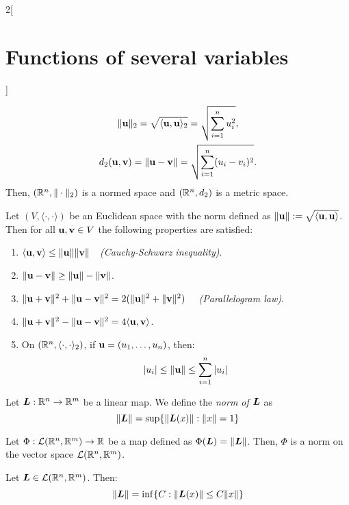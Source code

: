 \documentclass[../../../main.tex]{subfiles}
\begin{document}
\begin{multicols}{2}[\section{Functions of several variables}]
\begin{corollary}
    \begin{gather*}
      \|\vb{u}\|_2=\sqrt{\langle \vb{u},\vb{u}\rangle_2}=\sqrt{\sum_{i=1}^nu_i^2},\\
      d_2(\vb{u},\vb{v})=\|\vb{u}-\vb{v}\|=\sqrt{\sum_{i=1}^n(u_i-v_i)^2}.
    \end{gather*}
    Then, $(\mathbb{R}^n,\|\cdot\|_2)$ is a normed space and $(\mathbb{R}^n,d_2)$ is a metric space.
  \end{corollary}
  \begin{prop}
    Let $(V,\langle\cdot,\cdot\rangle)$ be an Euclidean space with the norm defined as $\|\vb{u}\|:=\sqrt{\langle \vb{u},\vb{u}\rangle}$. Then for all $\vb{u},\vb{v}\in V$ the following properties are satisfied:
    \begin{enumerate}
      \item $\langle \vb{u},\vb{v}\rangle\leq\|\vb{u}\|\|\vb{v}\|\quad$\textit{(Cauchy-Schwarz inequality)}.
      \item $\|\vb{u}-\vb{v}\|\geq\|\vb{u}\|-\|\vb{v}\|$.
      \item $\|\vb{u}+\vb{v}\|^2+\|\vb{u}-\vb{v}\|^2=2(\|\vb{u}\|^2+\|\vb{v}\|^2)\quad$ \textit{(Parallelogram law)}.
      \item $\|\vb{u}+\vb{v}\|^2-\|\vb{u}-\vb{v}\|^2=4\langle \vb{u},\vb{v}\rangle$.
      \item On $(\mathbb{R}^n,\langle\cdot,\cdot\rangle_2)$, if $\vb{u}=(u_1,\ldots,u_n)$, then: $$|u_i|\leq\|\vb{u}\|\leq\sum_{i=1}^n|u_i|$$
    \end{enumerate}
  \end{prop}
  \begin{definition}
    Let $\boldsymbol{L}:\mathbb{R}^n\rightarrow\mathbb{R}^m$ be a linear map. We define the \textit{norm of $\boldsymbol{L}$} as $$\|\boldsymbol{L}\|=\sup\{\|\boldsymbol{L}(x)\|:\|x\|=1\}$$
  \end{definition}
  \begin{lemma}
    Let $\Phi:\mathcal{L}(\mathbb{R}^n,\mathbb{R}^m)\rightarrow\mathbb{R} $ be a map defined as $\Phi(\boldsymbol{L})=\|\boldsymbol{L}\|$. Then, $\Phi$ is a norm on the vector space $\mathcal{L}(\mathbb{R}^n,\mathbb{R}^m)$.
  \end{lemma}
  \begin{prop}
    Let $\boldsymbol{L}\in\mathcal{L}(\mathbb{R}^n,\mathbb{R}^m)$. Then: $$\|\boldsymbol{L}\|=\inf\{C:\|\boldsymbol{L}(x)\|\leq C\|x\|\}$$

\end{prop}
\end{multicols}
\end{document}
